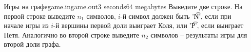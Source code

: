 \begin{problem}{Игры на графе}{game.in}{game.out}{3 seconds}{64 megabytes}
Выведите две строке. На первой строке выведите $n_1$ символов, $i$-й символ должен быть '\t{N}',
если при начале игры из $i$-й вершины первой доли выиграет Коля, или '\t{P}', если выиграет Петя.
Аналогично во второй строке выведите $n_2$ символов -- результаты игры для второй доли графа.

\Example

\begin{example}
%
\end{example}

\end{problem}
